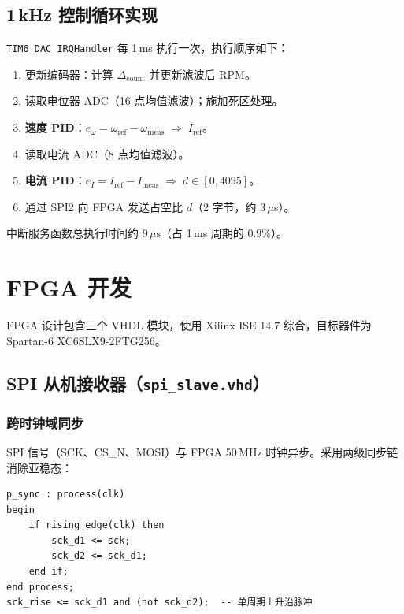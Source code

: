 \documentclass[12pt, a4paper]{ctexrep}
\begin{document}
\section{1\,kHz 控制循环实现}

\texttt{TIM6\_DAC\_IRQHandler} 每 1\,ms 执行一次，执行顺序如下：

\begin{enumerate}
    \item 更新编码器：计算 $\Delta_{\text{count}}$ 并更新滤波后 RPM。
    \item 读取电位器 ADC（16 点均值滤波）；施加死区处理。
    \item \textbf{速度 PID}：$e_\omega = \omega_{\text{ref}} - \omega_{\text{meas}}
          \;\Rightarrow\; I_{\text{ref}}$。
    \item 读取电流 ADC（8 点均值滤波）。
    \item \textbf{电流 PID}：$e_I = I_{\text{ref}} - I_{\text{meas}}
          \;\Rightarrow\; d \in [0, 4095]$。
    \item 通过 SPI2 向 FPGA 发送占空比 $d$（2 字节，约 $3\,\mu$s）。
\end{enumerate}

中断服务函数总执行时间约 $9\,\mu\text{s}$（占 1\,ms 周期的 0.9\%）。

\chapter{FPGA 开发}

FPGA 设计包含三个 VHDL 模块，使用 Xilinx ISE 14.7 综合，目标器件为 Spartan-6 XC6SLX9-2FTG256。

\section{SPI 从机接收器（\texttt{spi\_slave.vhd}）}

\subsection{跨时钟域同步}

SPI 信号（SCK、CS\_N、MOSI）与 FPGA 50\,MHz 时钟异步。采用两级同步链消除亚稳态：

\begin{lstlisting}[style=vhdlstyle, caption={SCK 两级同步链。}]
p_sync : process(clk)
begin
    if rising_edge(clk) then
        sck_d1 <= sck;
        sck_d2 <= sck_d1;
    end if;
end process;
sck_rise <= sck_d1 and (not sck_d2);  -- 单周期上升沿脉冲
\end{lstlisting}
\end{document}
